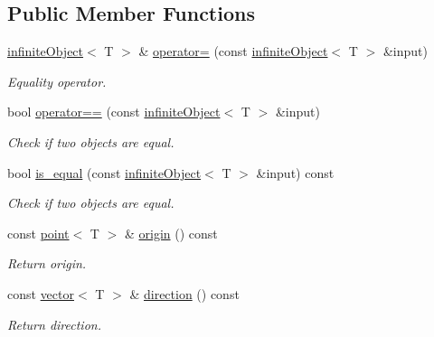 \subsection*{Public Member Functions}
\begin{DoxyCompactItemize}
\item 
\hyperlink{classddd_1_1infinite_object}{infinite\+Object}$<$ T $>$ \& \hyperlink{classddd_1_1infinite_object_a9ef05346c0b6794cd05d3e5d132ad6db}{operator=} (const \hyperlink{classddd_1_1infinite_object}{infinite\+Object}$<$ T $>$ \&input)
\begin{DoxyCompactList}\small\item\em Equality operator. \end{DoxyCompactList}\item 
bool \hyperlink{classddd_1_1infinite_object_a7cd3342d60d4de4e4fc91d90fa9cc065}{operator==} (const \hyperlink{classddd_1_1infinite_object}{infinite\+Object}$<$ T $>$ \&input)
\begin{DoxyCompactList}\small\item\em Check if two objects are equal. \end{DoxyCompactList}\item 
bool \hyperlink{classddd_1_1infinite_object_a64089c7dadb2ec0b414b155f5bd43339}{is\+\_\+equal} (const \hyperlink{classddd_1_1infinite_object}{infinite\+Object}$<$ T $>$ \&input) const
\begin{DoxyCompactList}\small\item\em Check if two objects are equal. \end{DoxyCompactList}\item 
\mbox{\label{classddd_1_1infinite_object_a0097f1df7ea358d410a73bdfcf2904f9}} 
const \hyperlink{classddd_1_1point}{point}$<$ T $>$ \& \hyperlink{classddd_1_1infinite_object_a0097f1df7ea358d410a73bdfcf2904f9}{origin} () const
\begin{DoxyCompactList}\small\item\em Return origin. \end{DoxyCompactList}\item 
\mbox{\label{classddd_1_1infinite_object_a7197d400db3804be122c78475c242a00}} 
const \hyperlink{classddd_1_1vector}{vector}$<$ T $>$ \& \hyperlink{classddd_1_1infinite_object_a7197d400db3804be122c78475c242a00}{direction} () const
\begin{DoxyCompactList}\small\item\em Return direction. \end{DoxyCompactList}\item 

\end{DoxyCompactItemize}
